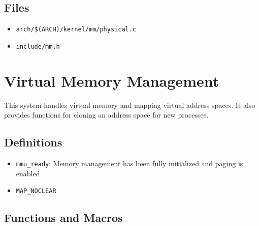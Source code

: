 \subsection{Files}
\begin{itemize}
\item \texttt{arch/\$(ARCH)/kernel/mm/physical.c}
\item \texttt{include/mm.h}
\end{itemize}

\section{Virtual Memory Management}
This system handles virtual memory and mapping virtual address spaces. It also provides
functions for cloning an address space for new processes.
\subsection{Definitions}
\begin{itemize}
\item \texttt{mmu\_ready}: Memory management has been fully initialized and paging is enabled
\item \texttt{MAP\_NOCLEAR}
\end{itemize}

\subsection{Functions and Macros}

